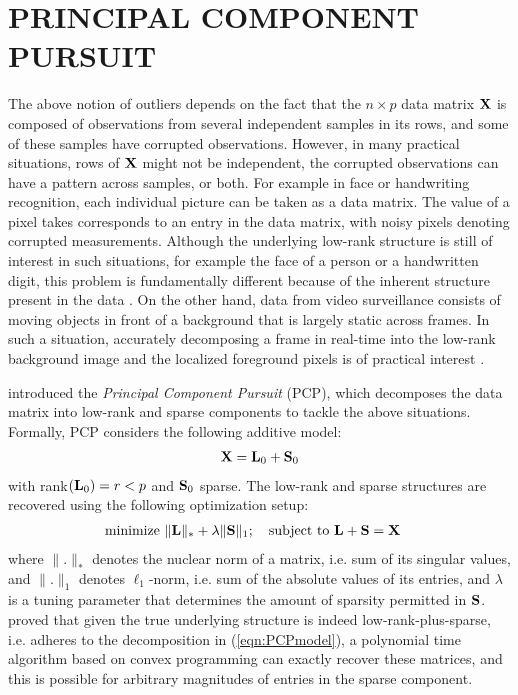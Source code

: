 \section*{\sffamily \Large PRINCIPAL COMPONENT PURSUIT}
\label{section:sec3}

The above notion of outliers depends on the fact that the $n \times p$ data matrix ${\mathbf{X}}$ is composed of observations from several independent samples in its rows, and some of these samples have corrupted observations. However, in many practical situations, rows of ${\mathbf{X}}$ might not be independent, the corrupted observations can have a pattern across samples, or both. For example in face or handwriting recognition, each individual picture can be taken as a data matrix. The value of a pixel takes corresponds to an entry in the data matrix, with noisy pixels denoting corrupted measurements. Although the underlying low-rank structure is still of interest in such situations, for example the face of a person or a handwritten digit, this problem is fundamentally different because of the inherent structure present in the data \citep{AlkandariAljaber15}. On the other hand, data from video surveillance consists of moving objects in front of a background that is largely static across frames. In such a situation, accurately decomposing a frame in real-time into the low-rank background image and the localized foreground pixels is of practical interest \citep{BouwmansBook,Bouwmans14}.

\cite{CandesEtal09} introduced the {\it Principal Component Pursuit} (PCP), which decomposes the data matrix into low-rank and sparse components to tackle the above situations. Formally, PCP considers the following additive model:
%
\begin{align}\label{eqn:PCPmodel}
{\mathbf{X}} = {\mathbf{L}}_0 + {\mathbf{S}}_0
\end{align}
%
with rank$({\mathbf{L}}_0) = r < p$ and ${\mathbf{S}}_0$ sparse. The low-rank and sparse structures are recovered using the following optimization setup:
%
\begin{align}\label{eqn:PCPobj}
& \text{minimize } \| {\mathbf{L}} \|_* + \lambda \| {\mathbf{S}} \|_1; \quad \text{subject to } {\mathbf{L}} + {\mathbf{S}} = {\mathbf{X}}
\end{align}
%
where $\|.\|_*$ denotes the nuclear norm of a matrix, i.e. sum of its singular values, and $\|.\|_1$ denotes $\ell_1$-norm, i.e. sum of the absolute values of its entries, and $\lambda $ is a tuning parameter that determines the amount of sparsity permitted in ${\mathbf{S}}$. \cite{CandesEtal09} proved that given the true underlying structure is indeed low-rank-plus-sparse, i.e. adheres to the decomposition in (\ref{eqn:PCPmodel}), a polynomial time algorithm based on convex programming can exactly recover these matrices, and this is possible for arbitrary magnitudes of entries in the sparse component.

